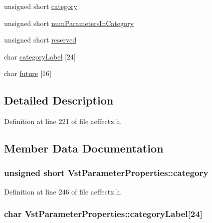 \begin{DoxyCompactItemize}
\item 
unsigned short \hyperlink{class_vst_parameter_properties_a8edc546d6162436c7d8a6e7cb6e38efa}{category}
\item 
unsigned short \hyperlink{class_vst_parameter_properties_ad38ce97d523e85cfa013c7864dea1531}{num\+Parameters\+In\+Category}
\item 
unsigned short \hyperlink{class_vst_parameter_properties_a1e35755bb1156dc1f61506816bf17eaa}{reserved}
\item 
char \hyperlink{class_vst_parameter_properties_af81417442b10b8937a8995427db3aa0d}{category\+Label} \mbox{[}24\mbox{]}
\item 
char \hyperlink{class_vst_parameter_properties_af987f30d8b06ab3bd25bc3c8a20f9f96}{future} \mbox{[}16\mbox{]}
\end{DoxyCompactItemize}


\subsection{Detailed Description}


Definition at line 221 of file aeffectx.\+h.



\subsection{Member Data Documentation}
\subsubsection[{\texorpdfstring{category}{category}}]{\setlength{\rightskip}{0pt plus 5cm}unsigned short Vst\+Parameter\+Properties\+::category}\hypertarget{class_vst_parameter_properties_a8edc546d6162436c7d8a6e7cb6e38efa}{}\label{class_vst_parameter_properties_a8edc546d6162436c7d8a6e7cb6e38efa}


Definition at line 246 of file aeffectx.\+h.

\subsubsection[{\texorpdfstring{category\+Label}{categoryLabel}}]{\setlength{\rightskip}{0pt plus 5cm}char Vst\+Parameter\+Properties\+::category\+Label\mbox{[}24\mbox{]}}\hypertarget{class_vst_parameter_properties_af81417442b10b8937a8995427db3aa0d}{}\label{class_vst_parameter_properties_af81417442b10b8937a8995427db3aa0d}


